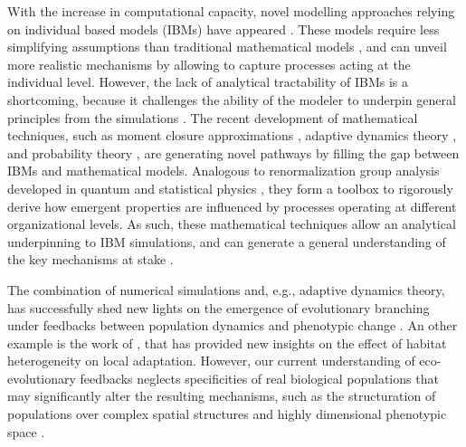 With the increase in computational capacity, novel modelling approaches relying on individual based models (IBMs) have appeared \citep{deangelis2005individual}. These models require less simplifying assumptions than traditional mathematical models \citep{deangelis2005individual}, and can unveil more realistic mechanisms by allowing to capture processes acting at the individual level. However, the lack of analytical tractability of IBMs is a shortcoming, because it challenges the ability of the modeler to underpin general principles from the simulations \citep{Lion2016,May2004}.
% 
The recent development of mathematical techniques, such as moment closure approximations \citep{law1999moment,Gandhi2000,Nordbotten2020,Lion2016}, adaptive dynamics theory \citep{Metz1995}, and probability theory \citep{Champagnat2006}, are generating novel pathways by filling the gap between IBMs and mathematical models. 
% 
% 
Analogous to renormalization group analysis developed in quantum and statistical physics \citep{Sayama}, they form a toolbox to rigorously derive how emergent properties are influenced by processes operating at different organizational levels. As such, these mathematical techniques allow an analytical underpinning to IBM simulations, and can generate a general understanding of the key mechanisms at stake \citep{Lion2016}.

The combination of numerical simulations and, e.g., adaptive dynamics theory, has successfully shed new lights on the emergence of evolutionary branching under feedbacks between population dynamics and phenotypic change \citep{Dieckmann1999,Doebeli2003}.
%
An other example is the work of \cite{Meszena1997,Debarre2013a, Mirrahimi2020}, that has provided new insights on the effect of habitat heterogeneity on local adaptation. 
% 
However, our current understanding of eco-evolutionary feedbacks neglects specificities of real biological populations that may significantly alter the resulting mechanisms, such as the structuration of populations over complex spatial structures \citep{Nowak2001a} and highly dimensional phenotypic space \citep{Doebeli2010}.

